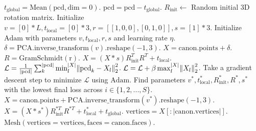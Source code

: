 \begin{algorithm}[H]
\begin{algorithmic}[1]
    \State $t_{\mathrm{global}} = \mathrm{Mean}(\mathrm{pcd}, \mathrm{dim}=0)$.
    \State $\mathrm{pcd} = \mathrm{pcd} - t_{\mathrm{global}}$. \Comment{\textcolor{blue}{Center the point cloud.}}
        \State $R_{\mathrm{init}} \leftarrow$ Random initial 3D rotation matrix.
        \State Initialize $v = [0]*L, t_{\mathrm{local}} = [0]*3, r = [[1, 0, 0], [0, 1, 0]], s = [1]*3$.
        \State Initialize $\mathrm{Adam}$ \cite{kingma17adam} with parameters $v, t_{\mathrm{local}}, r, s$ and learning rate $\eta$.
            \State $\delta = \mathrm{PCA.inverse\_transform}(v)\mathrm{.reshape(-1, 3)}$.
            \State $X = \mathrm{canon.points} + \delta$. \Comment{\textcolor{blue}{Warped canonical point cloud.}}
            \State $R = \mathrm{GramSchmidt(r)}$.
            \State $X = (X * s) R_{\mathrm{init}}^T R^T + t_{\mathrm{local}}$. \Comment{\textcolor{blue}{Scaled, rotated and translated point cloud.}}
            \State $\mathcal{L} = \frac{1}{|\mathrm{pcd}|} \sum_k^{|\mathrm{pcd}|} \min_l^{|X|} \norm{\mathrm{pcd}_k - X_l}_2^2$. \Comment{\textcolor{blue}{One-sided Chamfer distance.}}
            \State $\mathcal{L} = \mathcal{L} + \beta \max_l^{|X|} \norm{X_l}_2^2$. \Comment{\textcolor{blue}{Object size regularization.}}
            \State Take a gradient descent step to minimize $\mathcal{L}$ using $\mathrm{Adam}$.
        \EndFor
    \EndFor
    \State Find parameters $v^*, t^*_{\mathrm{local}}, R_{\mathrm{init}}^*, R^*, s^*$ with the lowest final loss across $i \in \{ 1, 2, ..., S \}$.
    \State $X = \mathrm{canon.points} +\mathrm{PCA.inverse\_transform}(v^*)\mathrm{.reshape(-1, 3)}$.
    \State $X = (X * s^*) R_{\mathrm{init}}^{*T} R^{*T} + t^*_{\mathrm{local}} + t_{\mathrm{global}}$. \Comment{\textcolor{blue}{Complete point cloud in workspace coordinates.}}
    \State $\mathrm{vertices} = X[:|\mathrm{canon.vertices}|]$. 
    \State \Return $\mathrm{Mesh}(\mathrm{vertices} = \mathrm{vertices}, \mathrm{faces} = \mathrm{canon.faces})$. \Comment{\textcolor{blue}{Warped mesh.}}

\end{algorithmic}

\end{algorithm}